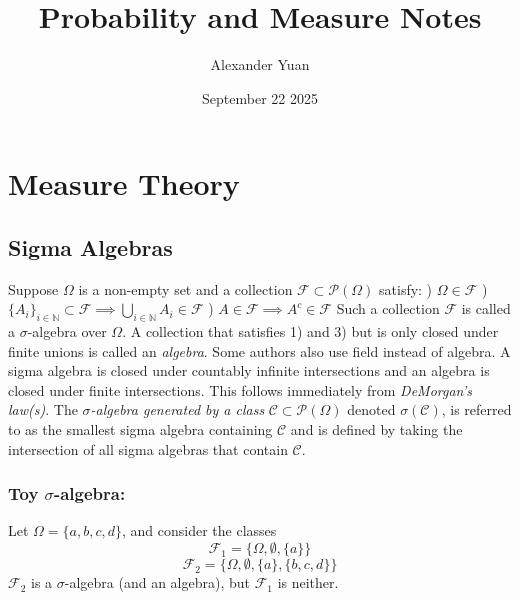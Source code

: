 \documentclass{article}
\title{Probability and Measure Notes}
\author{Alexander Yuan}
\date{September 22 2025}
\begin{document}
\maketitle

\section{Measure Theory}
\subsection{Sigma Algebras}
Suppose $\Omega$ is a non-empty set and a collection $\mathcal{F} \subset \mathcal{P}(\Omega)$ satisfy: \newline {}) $\Omega \in \mathcal{F}$ \newline {}) $\{A_i\}_{i \in \mathbb{N}} \subset \mathcal{F} \implies \bigcup_{i \in\mathbb{N}}A_i \in \mathcal{F}$ \newline {}) $A \in \mathcal{F} \implies A^c\in \mathcal{F} $ \newline \newline
Such a collection  $\mathcal{F}$ is called a $\sigma$-algebra over $\Omega$. A collection that satisfies 1) and 3) but is only closed under finite unions is called an \emph{algebra}. Some authors also use field instead of algebra. \newline \newline
A sigma algebra is closed under countably infinite intersections and an algebra is closed under finite intersections. This follows immediately from \emph{DeMorgan's law(s)}.\newline \newline
The \emph{$\sigma$-algebra generated by a class} $\mathcal{C}\subset \mathcal{P}(\Omega)$ denoted $\sigma(\mathcal{C})$, is referred to as the smallest sigma algebra containing $\mathcal{C}$ and is defined by taking the intersection of all sigma algebras that contain $\mathcal{C}$.

\subsubsection{Toy $\sigma$-algebra:}
Let $\Omega = \{a,b,c,d\}$, and consider the classes \[
\mathcal{F}_1 = \{\Omega, \emptyset, \{a\}\}
\]
\[
\mathcal{F}_2 = \{\Omega, \emptyset, \{a\}, \{b,c,d\}\}
\]
$\mathcal{F}_2$ is a $\sigma$-algebra (and an algebra), but $\mathcal{F}_1$ is neither. 
\end{document}
